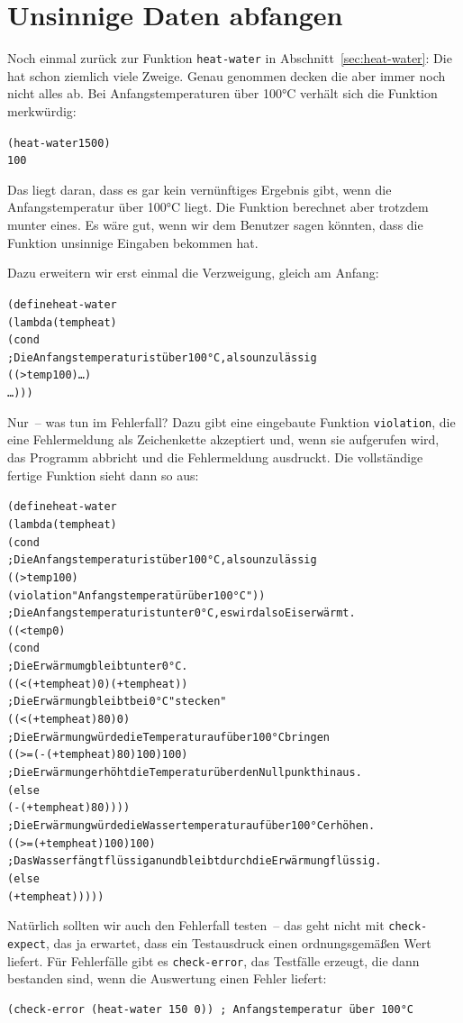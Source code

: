 \section{Unsinnige Daten abfangen}
\label{sec:nonsensical-data}

Noch einmal zurück zur Funktion \texttt{heat-water} in
Abschnitt~\ref{sec:heat-water}: Die hat schon ziemlich viele Zweige.
Genau genommen decken die aber immer noch nicht alles ab.  %
Bei Anfangstemperaturen über 100°C verhält sich die Funktion merkwürdig:
%
\begin{alltt}
(heat-water 150 0)
\evalsto{} 100
\end{alltt}
%
Das liegt daran, dass es gar kein vernünftiges Ergebnis gibt, wenn die
Anfangstemperatur über 100°C liegt.  Die Funktion berechnet aber
trotzdem munter eines.  Es wäre gut, wenn wir dem Benutzer sagen
könnten, dass die Funktion unsinnige Eingaben bekommen hat.

Dazu erweitern wir erst einmal die Verzweigung, gleich am Anfang:
%
\begin{alltt}
(define heat-water
  (lambda (temp heat)
    (cond
      ; Die Anfangstemperatur ist über 100°C, also unzulässig
      ((> temp 100) \ldots)
      \ldots)))
\end{alltt}
%
Nur~-- was tun im Fehlerfall?  Dazu gibt eine eingebaute Funktion
\texttt{violation}, die eine Fehlermeldung als Zeichenkette akzeptiert
und, wenn sie aufgerufen wird, das Programm abbricht und die
Fehlermeldung ausdruckt.  Die vollständige fertige Funktion sieht
dann so aus:
%
\begin{alltt}
(define heat-water
  (lambda (temp heat)
    (cond
      ; Die Anfangstemperatur ist über 100°C, also unzulässig
      ((> temp 100)
       (violation "Anfangstemperatür über 100°C"))
      ; Die Anfangstemperatur ist unter 0°C, es wird also Eis erwärmt.
      ((< temp 0)
       (cond
         ; Die Erwärmumg bleibt unter 0°C.
         ((< (+ temp heat) 0) (+ temp heat))
         ; Die Erwärmung bleibt bei  0°C "stecken"
         ((< (+ temp heat) 80) 0)
         ; Die Erwärmung würde die Temperatur auf über 100°C bringen
         ((>= (- (+ temp heat) 80) 100) 100)
         ; Die Erwärmung erhöht die Temperatur über den Nullpunkt hinaus.
         (else
          (- (+ temp heat) 80))))
      ; Die Erwärmung würde die Wassertemperatur auf über 100°C erhöhen.
      ((>= (+ temp heat) 100) 100)
      ; Das Wasser fängt flüssig an und bleibt durch die Erwärmung flüssig.
      (else
       (+ temp heat)))))
\end{alltt}
%
Natürlich sollten wir auch den Fehlerfall testen~-- das geht nicht mit
\texttt{check-expect}, das ja erwartet, dass ein Testausdruck einen
ordnungsgemäßen Wert liefert.  Für Fehlerfälle gibt es
\texttt{check-error}, das Testfälle erzeugt, die dann bestanden sind,
wenn die Auswertung einen Fehler liefert:
%
\begin{verbatim}
(check-error (heat-water 150 0)) ; Anfangstemperatur über 100°C
\end{verbatim}

